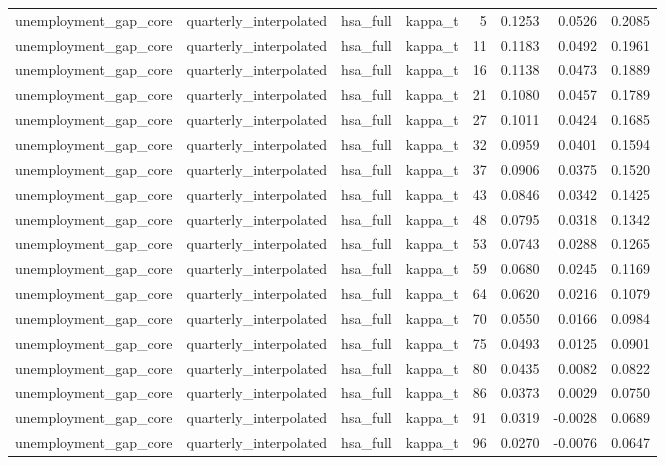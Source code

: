 \begin{tabular}{llllrrrr}
unemployment\_gap\_core & quarterly\_interpolated & hsa\_full & kappa\_t & 5 & 0.1253 & 0.0526 & 0.2085 \\
unemployment\_gap\_core & quarterly\_interpolated & hsa\_full & kappa\_t & 11 & 0.1183 & 0.0492 & 0.1961 \\
unemployment\_gap\_core & quarterly\_interpolated & hsa\_full & kappa\_t & 16 & 0.1138 & 0.0473 & 0.1889 \\
unemployment\_gap\_core & quarterly\_interpolated & hsa\_full & kappa\_t & 21 & 0.1080 & 0.0457 & 0.1789 \\
unemployment\_gap\_core & quarterly\_interpolated & hsa\_full & kappa\_t & 27 & 0.1011 & 0.0424 & 0.1685 \\
unemployment\_gap\_core & quarterly\_interpolated & hsa\_full & kappa\_t & 32 & 0.0959 & 0.0401 & 0.1594 \\
unemployment\_gap\_core & quarterly\_interpolated & hsa\_full & kappa\_t & 37 & 0.0906 & 0.0375 & 0.1520 \\
unemployment\_gap\_core & quarterly\_interpolated & hsa\_full & kappa\_t & 43 & 0.0846 & 0.0342 & 0.1425 \\
unemployment\_gap\_core & quarterly\_interpolated & hsa\_full & kappa\_t & 48 & 0.0795 & 0.0318 & 0.1342 \\
unemployment\_gap\_core & quarterly\_interpolated & hsa\_full & kappa\_t & 53 & 0.0743 & 0.0288 & 0.1265 \\
unemployment\_gap\_core & quarterly\_interpolated & hsa\_full & kappa\_t & 59 & 0.0680 & 0.0245 & 0.1169 \\
unemployment\_gap\_core & quarterly\_interpolated & hsa\_full & kappa\_t & 64 & 0.0620 & 0.0216 & 0.1079 \\
unemployment\_gap\_core & quarterly\_interpolated & hsa\_full & kappa\_t & 70 & 0.0550 & 0.0166 & 0.0984 \\
unemployment\_gap\_core & quarterly\_interpolated & hsa\_full & kappa\_t & 75 & 0.0493 & 0.0125 & 0.0901 \\
unemployment\_gap\_core & quarterly\_interpolated & hsa\_full & kappa\_t & 80 & 0.0435 & 0.0082 & 0.0822 \\
unemployment\_gap\_core & quarterly\_interpolated & hsa\_full & kappa\_t & 86 & 0.0373 & 0.0029 & 0.0750 \\
unemployment\_gap\_core & quarterly\_interpolated & hsa\_full & kappa\_t & 91 & 0.0319 & -0.0028 & 0.0689 \\
unemployment\_gap\_core & quarterly\_interpolated & hsa\_full & kappa\_t & 96 & 0.0270 & -0.0076 & 0.0647 \\

\end{tabular}
